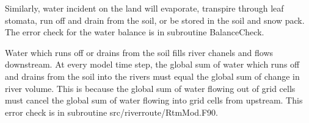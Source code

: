 \documentclass[]{article}
\begin{document}
Similarly, water incident on the land will evaporate, transpire
through leaf stomata, run off and drain from the soil, or be stored in
the soil and snow pack. The error check for the water balance is in
subroutine BalanceCheck.

Water which runs off or drains from the soil fills river chanels and
flows downstream. At every model time step, the global sum of water
which runs off and drains from the soil into the rivers must equal the
global sum of change in river volume. This is because the global sum
of water flowing out of grid cells must cancel the global sum of water
flowing into grid cells from upstream. This error check is in
subroutine src/riverroute/RtmMod.F90.
\end{document}
